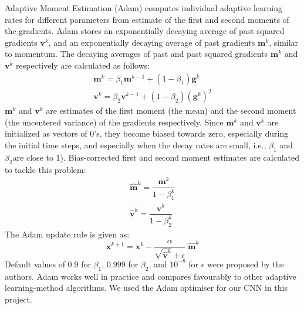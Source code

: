 \documentclass[12pt]{report}
\numberwithin{equation}{section}
\begin{document}
Adaptive Moment Estimation (Adam) \textbf{\cite{kingma2014adam}} computes individual adaptive learning rates for different parameters from estimate of the first and second moments of the gradients. Adam stores an exponentially decaying average of past squared gradients $\bm{v}^k$, and an exponentially decaying average of past gradients $\bm{m}^k$, similar to momentum. The decaying averages of past and past squared gradients $\bm{m}^k$ and $\bm{v}^k$ respectively are calculated as follows:
\begin{equation}\label{eqn:adam_mean}
\begin{array}{l}
\bm{m}^k = \beta_1\bm{m}^{k-1} + (1-\beta_1)\bm{g}^k \\
\bm{v}^k = \beta_2\bm{v}^{k-1} + (1-\beta_2)(\bm{g}^k)^2
\end{array}
\end{equation} \noindent
$\bm{m}^k$ and $\bm{v}^k$ are estimates of the first moment (the mean) and the second moment (the uncentered variance) of the gradients respectively. Since $\bm{m}^k$ and $\bm{v}^k$ are initialized as vectors of $0$'s, they become biased towards zero, especially during the initial time steps, and especially when the decay rates are small, i.e., $\beta_1$ and $\beta_2$are close to 1). Bias-corrected first and second moment estimates are calculated to tackle this problem:
\begin{equation}\label{eqn:adam_bias}
\begin{array}{l}
\hat{\bm{m}}^k = \dfrac{\bm{m}^k}{1-\beta^k_1} \\
\hat{\bm{v}}^k = \dfrac{\bm{v}^k}{1-\beta^k_2}
\end{array}
\end{equation}\noindent
The Adam update rule is given as:
\begin{equation}\label{eqn:adam}
\bm{x}^{k+1} = \bm{x}^{k} - \dfrac{\alpha}{\sqrt{\hat{\bm{v}}^k} + \epsilon}\; \hat{\bm{m}}^k
\end{equation}\noindent
Default values of $0.9$ for $\beta_1$, $0.999$ for $\beta_2$, and $10^{-8}$ for $\epsilon$ were proposed by the authors. Adam works well in practice and compares favourably to other adaptive learning-method algorithms. We used the Adam optimiser for our CNN in this project.
\end{document}
